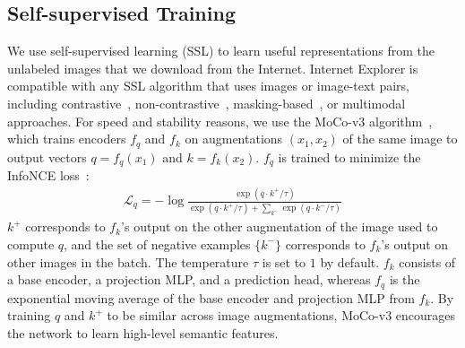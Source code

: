 
\subsection{Self-supervised Training}
\label{subsec:ssl}

We use self-supervised learning (SSL) to learn useful representations from the unlabeled images that we download from the Internet. 
Internet Explorer is compatible with any SSL algorithm that uses images or image-text pairs, including contrastive~\cite{he2020momentum,chen2020simple}, non-contrastive~\cite{grill2020bootstrap,zbontar2021barlow,bardes2021vicreg,caron2021emerging}, masking-based~\cite{bao2021beit,he2022masked}, or multimodal~\cite{radford2021learning} approaches. 
For speed and stability reasons, we use the MoCo-v3 algorithm~\cite{chen2021empirical}, which trains encoders $f_q$ and $f_k$ on augmentations $(x_1, x_2)$ of the same image to output vectors $q = f_q(x_1)$ and $k = f_k(x_2)$. $f_q$ is trained to minimize the InfoNCE loss~\cite{oord2018representation}:
\begin{align}
    \mathcal L_q = -\log \frac{\exp(q \cdot k^+ / \tau)}{\exp (q \cdot k^+ / \tau) + \sum_{k^-} \exp (q \cdot k^- / \tau) }
\label{eq:moco_loss}
\end{align}
$k^+$ corresponds to $f_k$'s output on the other augmentation of the image used to compute $q$, and the set of negative examples $\{k^-\}$ corresponds to $f_k$'s output on other images in the batch. The temperature $\tau$ is set to $1$ by default. $f_k$ consists of a base encoder, a projection MLP, and a prediction head, whereas $f_q$ is the exponential moving average of the base encoder and projection MLP from $f_k$. By training $q$ and $k^+$ to be similar across image augmentations, MoCo-v3 encourages the network to learn high-level semantic features. 

